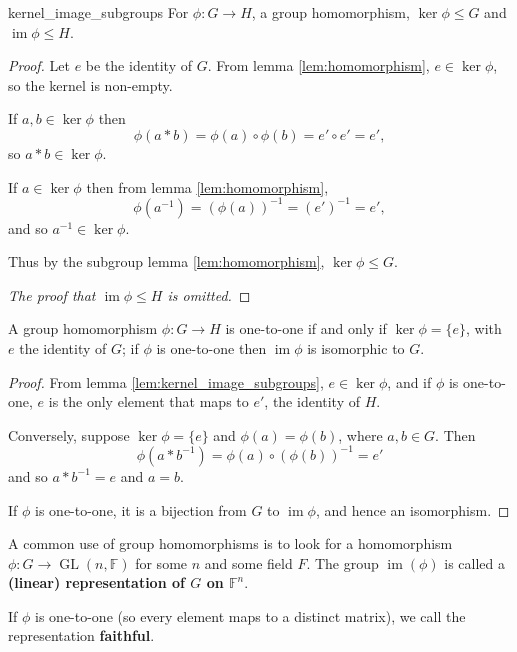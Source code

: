 \begin{lemma}{\cite{math2601_notes}}{kernel_image_subgroups}
For $\phi : G \to H$, a group homomorphism, $\ker \phi \leq G$ and $\operatorname{im} \phi \leq H$.

\begin{proof}
Let $e$ be the identity of $G$. From lemma \ref{lem:homomorphism}, $e \in \ker \phi$, so the kernel is non-empty.

If $a, b \in \ker \phi$ then
$$ \phi (a * b) = \phi (a) \circ \phi (b) = e' \circ e' = e' , $$
so $a * b \in \ker \phi$.

If $a \in \ker \phi$ then from lemma \ref{lem:homomorphism},
$$ \phi (a^{-1}) = (\phi (a))^{-1} = (e')^{-1} = e' , $$
and so $a^{-1} \in \ker \phi$.

Thus by the subgroup lemma \ref{lem:homomorphism}, $\ker \phi \leq G$.

\textit{The proof that $\operatorname{im} \phi \leq H$ is omitted.}
\end{proof}
\end{lemma}

\begin{lemma}{\cite{math2601_notes}}{}
A group homomorphism $\phi : G \to H$ is one-to-one if and only if $\ker \phi = \{e\}$, with $e$ the identity of $G$; if $\phi$ is one-to-one then $\operatorname{im} \phi$ is isomorphic to $G$.

\begin{proof}
From lemma \ref{lem:kernel_image_subgroups}, $e \in \ker \phi$, and if $\phi$ is one-to-one, $e$ is the only element that maps to $e'$, the identity of $H$.

Conversely, suppose $\ker \phi = \{e\}$ and $\phi (a) = \phi (b)$, where $a, b \in G$. Then
$$ \phi (a * b^{-1}) = \phi (a) \circ (\phi (b))^{-1} = e' $$
and so $a * b^{-1} = e$ and $a = b$.

If $\phi$ is one-to-one, it is a bijection from $G$ to $\operatorname{im} \phi$, and hence an isomorphism.
\end{proof}
\end{lemma}

A common use of group homomorphisms is to look for a homomorphism $\phi : G \to \operatorname{GL}(n, \mathbb{F})$ for some $n$ and some field $F$. The group $\operatorname{im} (\phi)$ is called a \textbf{(linear) representation of $G$ on $\mathbb{F}^n$}.

If $\phi$ is one-to-one (so every element maps to a distinct matrix), we call the representation \textbf{faithful}.

